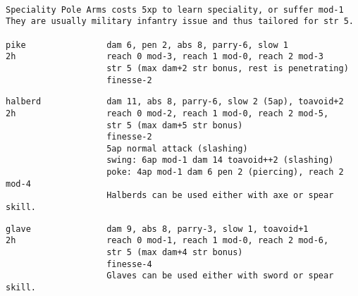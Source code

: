 \

\goodbreak \small \begin{samepage} \begin{verbatim}
Speciality Pole Arms costs 5xp to learn speciality, or suffer mod-1
They are usually military infantry issue and thus tailored for str 5.

pike                dam 6, pen 2, abs 8, parry-6, slow 1
2h                  reach 0 mod-3, reach 1 mod-0, reach 2 mod-3
                    str 5 (max dam+2 str bonus, rest is penetrating)
                    finesse-2
\end{verbatim} \blocklistgap \begin{verbatim}
halberd             dam 11, abs 8, parry-6, slow 2 (5ap), toavoid+2
2h                  reach 0 mod-2, reach 1 mod-0, reach 2 mod-5,
                    str 5 (max dam+5 str bonus)
                    finesse-2
                    5ap normal attack (slashing)
                    swing: 6ap mod-1 dam 14 toavoid++2 (slashing)
                    poke: 4ap mod-1 dam 6 pen 2 (piercing), reach 2 mod-4
                    Halberds can be used either with axe or spear skill.
\end{verbatim} \blocklistgap \begin{verbatim}
glave               dam 9, abs 8, parry-3, slow 1, toavoid+1
2h                  reach 0 mod-1, reach 1 mod-0, reach 2 mod-6,
                    str 5 (max dam+4 str bonus)
                    finesse-4
                    Glaves can be used either with sword or spear skill.
\end{verbatim} \end{samepage} \normalsize \goodbreak

\

